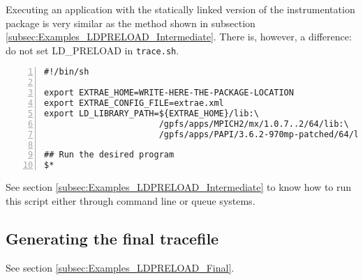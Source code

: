 Executing an application with the statically linked version of the instrumentation package is very similar as the method shown in subsection \ref{subsec:Examples_LDPRELOAD_Intermediate}. There is, however, a difference: do not set LD\_PRELOAD in {\tt trace.sh}.

\begin{Verbatim}[frame=single,numbers=left,labelposition=topline,label=trace.sh]
#!/bin/sh

export EXTRAE_HOME=WRITE-HERE-THE-PACKAGE-LOCATION
export EXTRAE_CONFIG_FILE=extrae.xml
export LD_LIBRARY_PATH=${EXTRAE_HOME}/lib:\
                       /gpfs/apps/MPICH2/mx/1.0.7..2/64/lib:\
                       /gpfs/apps/PAPI/3.6.2-970mp-patched/64/lib

## Run the desired program
$*
\end{Verbatim}

See section \ref{subsec:Examples_LDPRELOAD_Intermediate} to know how to run this script either through command line or queue systems.

\subsection{Generating the final tracefile}\label{subsec:Examples_static_Final}

See section \ref{subsec:Examples_LDPRELOAD_Final}.
